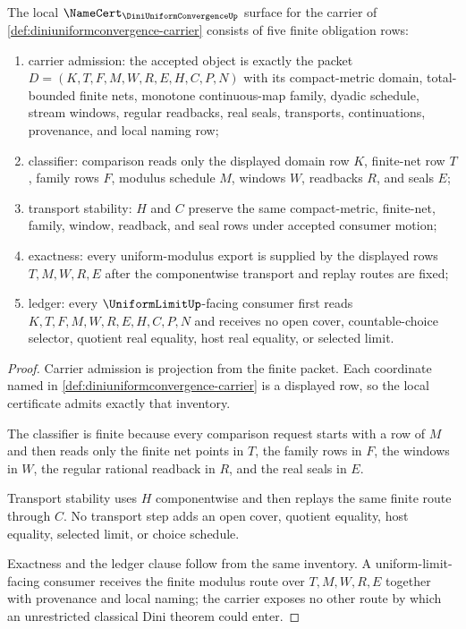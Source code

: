 \begin{theorem}
\label{thm:diniuniformconvergence-namecert-obligations}
The local $\NameCert_{\DiniUniformConvergenceUp}$ surface for the carrier of \autoref{def:diniuniformconvergence-carrier} consists of five finite obligation rows:
\begin{enumerate}
\item carrier admission: the accepted object is exactly the packet $D=(K,T,F,M,W,R,E,H,C,P,N)$ with its compact-metric domain, total-bounded finite nets, monotone continuous-map family, dyadic schedule, stream windows, regular readbacks, real seals, transports, continuations, provenance, and local naming row;
\item classifier: comparison reads only the displayed domain row $K$, finite-net row $T$, family rows $F$, modulus schedule $M$, windows $W$, readbacks $R$, and seals $E$;
\item transport stability: $H$ and $C$ preserve the same compact-metric, finite-net, family, window, readback, and seal rows under accepted consumer motion;
\item exactness: every uniform-modulus export is supplied by the displayed rows $T,M,W,R,E$ after the componentwise transport and replay routes are fixed;
\item ledger: every $\UniformLimitUp$-facing consumer first reads $K,T,F,M,W,R,E,H,C,P,N$ and receives no open cover, countable-choice selector, quotient real equality, host real equality, or selected limit.
\end{enumerate}
\end{theorem}
\begin{proof}
Carrier admission is projection from the finite packet. Each coordinate named in \autoref{def:diniuniformconvergence-carrier} is a displayed row, so the local certificate admits exactly that inventory.

The classifier is finite because every comparison request starts with a row of $M$ and then reads only the finite net points in $T$, the family rows in $F$, the windows in $W$, the regular rational readback in $R$, and the real seals in $E$.

Transport stability uses $H$ componentwise and then replays the same finite route through $C$. No transport step adds an open cover, quotient equality, host equality, selected limit, or choice schedule.

Exactness and the ledger clause follow from the same inventory. A uniform-limit-facing consumer receives the finite modulus route over $T,M,W,R,E$ together with provenance and local naming; the carrier exposes no other route by which an unrestricted classical Dini theorem could enter.
\end{proof}

